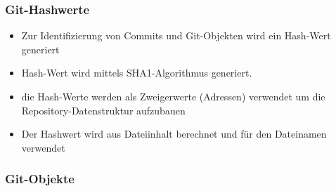 \subsubsection{Git-Hashwerte}
\begin{itemize}
	\item Zur Identifizierung von Commits und Git-Objekten wird ein Hash-Wert generiert
	\item Hash-Wert wird mittels SHA1-Algorithmus generiert.
	\item die Hash-Werte werden als Zweigerwerte (Adressen) verwendet um die Repository-Datenstruktur aufzubauen
	\item Der Hashwert wird aus Dateiinhalt berechnet und für den Dateinamen verwendet
\end{itemize}
\clearpage
\pagebreak
\subsubsection{Git-Objekte}
